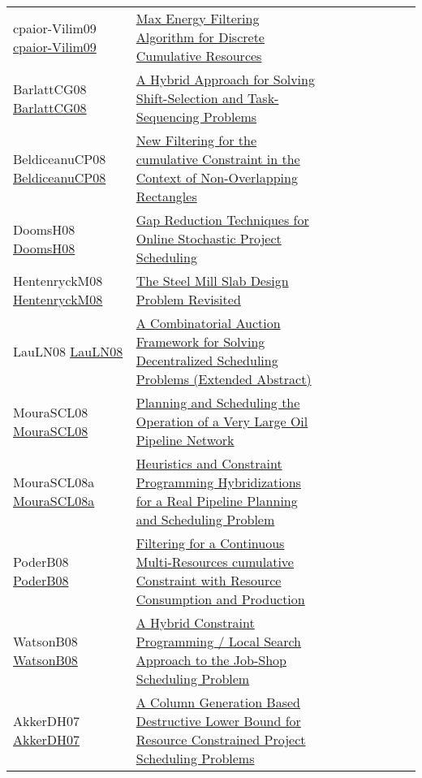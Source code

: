 {\begin{longtable}{p{3cm}p{7cm}lllllll}
cpaior-Vilim09 \href{https://doi.org/10.1007/978-3-642-01929-6\_22}{cpaior-Vilim09} &  \href{papers/cpaior-Vilim09.pdf}{Max Energy Filtering Algorithm for Discrete Cumulative Resources} &  &  &  &  &  &  & \\
BarlattCG08 \href{https://doi.org/10.1007/978-3-540-68155-7\_24}{BarlattCG08} &  \href{papers/BarlattCG08.pdf}{A Hybrid Approach for Solving Shift-Selection and Task-Sequencing Problems} &  &  &  &  &  &  & \\
BeldiceanuCP08 \href{https://doi.org/10.1007/978-3-540-68155-7\_5}{BeldiceanuCP08} &  \href{papers/BeldiceanuCP08.pdf}{New Filtering for the cumulative Constraint in the Context of Non-Overlapping Rectangles} &  &  &  &  &  &  & \\
DoomsH08 \href{https://doi.org/10.1007/978-3-540-68155-7\_8}{DoomsH08} &  \href{papers/DoomsH08.pdf}{Gap Reduction Techniques for Online Stochastic Project Scheduling} &  &  &  &  &  &  & \\
HentenryckM08 \href{https://doi.org/10.1007/978-3-540-68155-7\_41}{HentenryckM08} &  \href{papers/HentenryckM08.pdf}{The Steel Mill Slab Design Problem Revisited} &  &  &  &  &  &  & \\
LauLN08 \href{https://doi.org/10.1007/978-3-540-68155-7\_33}{LauLN08} &  \href{papers/LauLN08.pdf}{A Combinatorial Auction Framework for Solving Decentralized Scheduling Problems (Extended Abstract)} &  &  &  &  &  &  & \\
MouraSCL08 \href{https://doi.org/10.1007/978-3-540-85958-1\_3}{MouraSCL08} &  \href{papers/MouraSCL08.pdf}{Planning and Scheduling the Operation of a Very Large Oil Pipeline Network} &  &  &  &  &  &  & \\
MouraSCL08a \href{https://doi.org/10.1109/CSE.2008.24}{MouraSCL08a} &  \href{papers/MouraSCL08a.pdf}{Heuristics and Constraint Programming Hybridizations for a Real Pipeline Planning and Scheduling Problem} &  &  &  &  &  &  & \\
PoderB08 \href{http://www.aaai.org/Library/ICAPS/2008/icaps08-033.php}{PoderB08} &  \href{papers/PoderB08.pdf}{Filtering for a Continuous Multi-Resources cumulative Constraint with Resource Consumption and Production} &  &  &  &  &  &  & \\
WatsonB08 \href{https://doi.org/10.1007/978-3-540-68155-7\_21}{WatsonB08} &  \href{papers/WatsonB08.pdf}{A Hybrid Constraint Programming / Local Search Approach to the Job-Shop Scheduling Problem} &  &  &  &  &  &  & \\
AkkerDH07 \href{https://doi.org/10.1007/978-3-540-72397-4\_27}{AkkerDH07} &  \href{papers/AkkerDH07.pdf}{A Column Generation Based Destructive Lower Bound for Resource Constrained Project Scheduling Problems} &  &  &  &  &  &  & \\

\end{longtable}}
